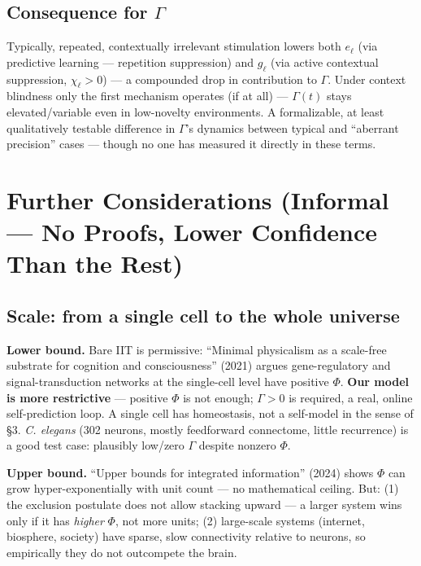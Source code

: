 \documentclass[11pt]{article}
\begin{document}
\subsection*{Consequence for $\Gamma$}
Typically, repeated, contextually irrelevant stimulation lowers both $e_\ell$ (via predictive learning --- repetition suppression) and $g_\ell$ (via active contextual suppression, $\chi_\ell>0$) --- a compounded drop in contribution to $\Gamma$. Under context blindness only the first mechanism operates (if at all) --- $\Gamma(t)$ stays elevated/variable even in low-novelty environments. A formalizable, at least qualitatively testable difference in $\Gamma$'s dynamics between typical and ``aberrant precision'' cases --- though no one has measured it directly in these terms.

\section{Further Considerations (Informal --- No Proofs, Lower Confidence Than the Rest)}

\subsection*{Scale: from a single cell to the whole universe}

\textbf{Lower bound.} Bare IIT is permissive: ``Minimal physicalism as a scale-free substrate for cognition and consciousness'' (2021) argues gene-regulatory and signal-transduction networks at the single-cell level have positive $\Phi$. \textbf{Our model is more restrictive} --- positive $\Phi$ is not enough; $\Gamma>0$ is required, a real, online self-prediction loop. A single cell has homeostasis, not a self-model in the sense of \S3. \emph{C. elegans} (302 neurons, mostly feedforward connectome, little recurrence) is a good test case: plausibly low/zero $\Gamma$ despite nonzero $\Phi$.

\textbf{Upper bound.} ``Upper bounds for integrated information'' (2024) shows $\Phi$ can grow hyper-exponentially with unit count --- no mathematical ceiling. But: (1) the exclusion postulate does not allow stacking upward --- a larger system wins only if it has \emph{higher} $\Phi$, not more units; (2) large-scale systems (internet, biosphere, society) have sparse, slow connectivity relative to neurons, so empirically they do not outcompete the brain.
\end{document}
